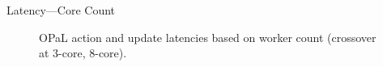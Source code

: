 \documentclass[aspectratio=169,xcolor={dvipsnames}
,handout
]{beamer}
\newcommand{\approachshort}{OPaL}
\begin{document}
\begin{frame}{Latency---Core Count}
	\begin{figure}
		\centering
		\begin{subfigure}{0.49\linewidth}
		\end{subfigure}
		\begin{subfigure}{0.49\linewidth}
		\end{subfigure}
		\caption{\approachshort{} action and update latencies based on worker count (crossover at 3-core, 8-core).}
	\end{figure}
\end{frame}
\end{document}
